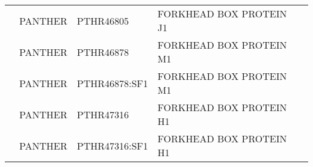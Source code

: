 \documentclass[../main.tex]{subfiles}
\begin{document}
\begin{landscape}
\begin{longtable}{@{}cllll@{}}
		                                & PANTHER              & PTHR46805       & FORKHEAD BOX PROTEIN J1                                                                                                                      & \\
		                                & PANTHER              & PTHR46878       & FORKHEAD BOX PROTEIN M1                                                                                                                      & \\
		                                & PANTHER              & PTHR46878:SF1   & FORKHEAD BOX PROTEIN M1                                                                                                                      & \\
		                                & PANTHER              & PTHR47316       & FORKHEAD BOX PROTEIN H1                                                                                                                      & \\
		                                & PANTHER              & PTHR47316:SF1   & FORKHEAD BOX PROTEIN H1                                                                                                                      & \\* \bottomrule \bottomrule
	\end{longtable}
\end{landscape}
\end{document}
